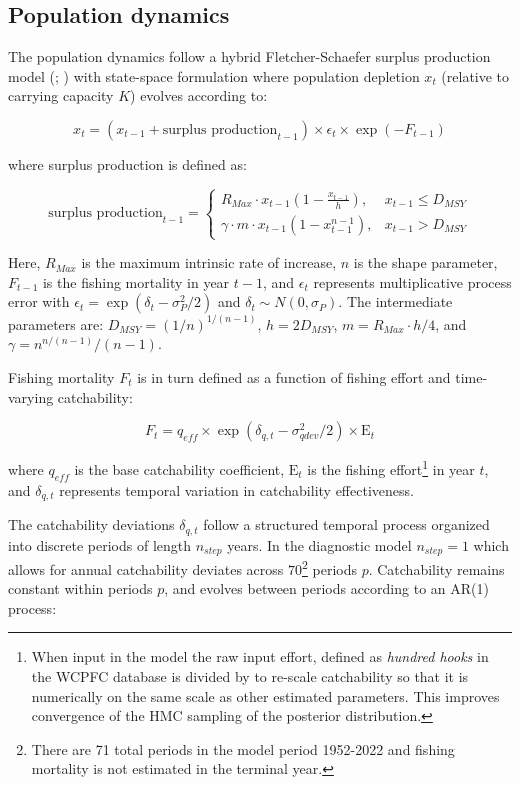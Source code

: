 \documentclass[
  11pt,
]{SCreport}
\begin{document}
\subsection{Population dynamics}\label{sec-population-dynamics}

The population dynamics follow a hybrid Fletcher-Schaefer surplus
production model (;
) with state-space formulation
where population depletion \(x_t\) (relative to carrying capacity \(K\))
evolves according to:

\[x_t = \left(x_{t-1} + \text{surplus production}_{t-1}\right) \times \epsilon_t \times \exp(-F_{t-1})\]

where surplus production is defined as:

\[\text{surplus production}_{t-1} = \begin{cases} 
R_{Max} \cdot x_{t-1} \left(1 - \frac{x_{t-1}}{h}\right), & x_{t-1} \leq D_{MSY} \\
\gamma \cdot m \cdot x_{t-1} \left(1 - x_{t-1}^{n-1}\right), & x_{t-1} > D_{MSY}
\end{cases}\]

Here, \(R_{Max}\) is the maximum intrinsic rate of increase, \(n\) is
the shape parameter, \(F_{t-1}\) is the fishing mortality in year
\(t-1\), and \(\epsilon_t\) represents multiplicative process error with
\(\epsilon_t = \exp(\delta_t - \sigma_P^2/2)\) and
\(\delta_t \sim N(0, \sigma_P)\). The intermediate parameters are:
\(D_{MSY} = (1/n)^{1/(n-1)}\), \(h = 2D_{MSY}\),
\(m = R_{Max} \cdot h/4\), and \(\gamma = n^{n/(n-1)}/(n-1)\).

Fishing mortality \(F_t\) is in turn defined as a function of fishing
effort and time-varying catchability:

\[F_t = q_{eff} \times \exp(\delta_{q,t} - \sigma_{qdev}^2/2) \times \text{E}_t\]

where \(q_{eff}\) is the base catchability coefficient, \(\text{E}_t\)
is the fishing effort\footnote{When input in the model the raw input
  effort, defined as \emph{hundred hooks} in the WCPFC database is
  divided by  to re-scale catchability so that it is
  numerically on the same scale as other estimated parameters. This
  improves convergence of the HMC sampling of the posterior
  distribution.} in year \(t\), and \(\delta_{q,t}\) represents temporal
variation in catchability effectiveness.

The catchability deviations \(\delta_{q,t}\) follow a structured
temporal process organized into discrete periods of length \(n_{step}\)
years. In the diagnostic model \(n_{step} = 1\) which allows for annual
catchability deviates across \(70\)\footnote{There are 71 total periods
  in the model period 1952-2022 and fishing mortality is not estimated
  in the terminal year.} periods \(p\). Catchability remains constant
within periods \(p\), and evolves between periods according to an AR(1)
process:
\end{document}
